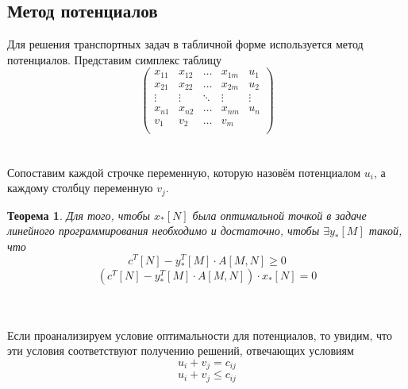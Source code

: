 \documentclass{article}
\newtheorem{theorem}{Теорема}
\begin{document}
\subsection{Метод потенциалов}

\noindent Для решения транспортных задач в табличной форме используется метод потенциалов. Представим симплекс таблицу
\begin{equation*}
    \left(\begin{array}{cccc|c}  
    x_{11} & x_{12} & \ldots & x_{1m} & u_1\\
    x_{21} & x_{22} & \ldots & x_{2m} & u_2\\
    \vdots & \vdots & \ddots & \vdots & \vdots\\
    x_{n1} & x_{n2} & \ldots & x_{nm} & u_n\\
    \hline
    v_1 & v_2 & \ldots & v_m &\\
    \end{array}\right)
\end{equation*}
\\\\
Сопоставим каждой строчке переменную, которую назовём потенциалом $u_i$, а каждому столбцу переменную $v_j$. 
\begin{theorem}
Для того, чтобы $x_{*}[N]$ была оптимальной точкой в задаче линейного программирования необходимо и достаточно, чтобы $\exists y_{*}[M]$ такой, что
\begin{equation*}
    c^T[N]-y_{*}^T[M] \cdot A[M,N] \ge 0
\end{equation*}
\begin{equation*}
    (c^T[N]-y_{*}^T[M] \cdot A[M,N]) \cdot x_{*}[N] = 0
\end{equation*}
\label{th}
\end{theorem}
\\\\
\noindent Если проанализируем условие оптимальности для потенциалов, то увидим, что эти условия соответствуют получению решений, отвечающих условиям
$$u_i+v_j=c_{ij}$$ $$u_i+v_j \le c_{ij}$$
\end{document}
